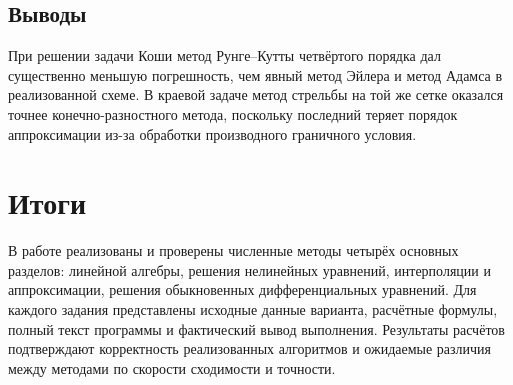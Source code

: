 \documentclass[12pt,a4paper]{article}
\begin{document}
\subsection{Выводы}
При решении задачи Коши метод Рунге--Кутты четвёртого порядка дал
существенно меньшую погрешность, чем явный метод Эйлера и метод Адамса в
реализованной схеме. В краевой задаче метод стрельбы на той же сетке
оказался точнее конечно-разностного метода, поскольку последний теряет
порядок аппроксимации из-за обработки производного граничного условия.

\section{Итоги}
В работе реализованы и проверены численные методы четырёх основных разделов:
линейной алгебры, решения нелинейных уравнений, интерполяции и
аппроксимации, решения обыкновенных дифференциальных уравнений. Для каждого
задания представлены исходные данные варианта, расчётные формулы, полный
текст программы и фактический вывод выполнения. Результаты расчётов
подтверждают корректность реализованных алгоритмов и ожидаемые различия
между методами по скорости сходимости и точности.
\end{document}
